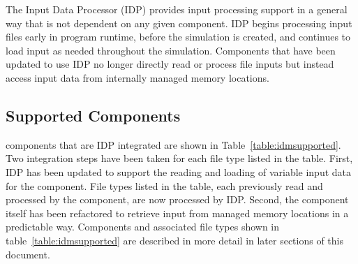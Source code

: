 The \mf Input Data Processor (IDP) provides input processing support in a general way that is not dependent on any given component.  IDP begins processing input files early in program runtime, before the simulation is created, and continues to load input as needed throughout the simulation.  Components that have been updated to use IDP no longer directly read or process file inputs but instead access input data from internally managed memory locations.

\subsection{Supported Components}

\mf components that are IDP integrated are shown in Table~\ref{table:idmsupported}.  Two integration steps have been taken for each file type listed in the table.  First, IDP has been updated to support the reading and loading of variable input data for the component.  File types listed in the table, each previously read and processed by the component, are now processed by IDP.  Second, the component itself has been refactored to retrieve input from managed memory locations in a predictable way.  Components and associated file types shown in table~\ref{table:idmsupported} are described in more detail in later sections of this document.


